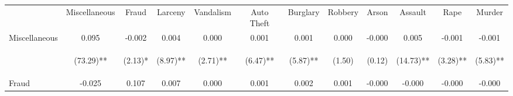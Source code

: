 \begin{tabular}{lccccccccccc}
\toprule \noalign{\smallskip} & Miscellaneous & Fraud & Larceny & Vandalism & Auto Theft & Burglary & Robbery & Arson & Assault & Rape & Murder\\
\noalign{\smallskip}\midrule \noalign{\smallskip}Miscellaneous & 0.095 & -0.002 & 0.004 & 0.000 & 0.001 & 0.001 & 0.000 & -0.000 & 0.005 & -0.001 & -0.001\\
 & \begin{footnotesize}(73.29)**\end{footnotesize} & \begin{footnotesize}(2.13)*\end{footnotesize} & \begin{footnotesize}(8.97)**\end{footnotesize} & \begin{footnotesize}(2.71)**\end{footnotesize} & \begin{footnotesize}(6.47)**\end{footnotesize} & \begin{footnotesize}(5.87)**\end{footnotesize} & \begin{footnotesize}(1.50)\end{footnotesize} & \begin{footnotesize}(0.12)\end{footnotesize} & \begin{footnotesize}(14.73)**\end{footnotesize} & \begin{footnotesize}(3.28)**\end{footnotesize} & \begin{footnotesize}(5.83)**\end{footnotesize}\\
\noalign{\smallskip}Fraud & -0.025 & 0.107 & 0.007 & 0.000 & 0.001 & 0.002 & 0.001 & -0.000 & -0.000 & -0.000 & -0.000\\

\end{tabular}
